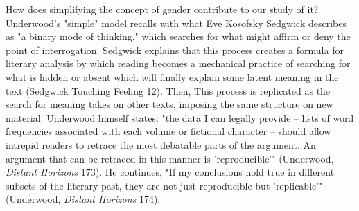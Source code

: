 \documentclass[11pt]{article}
\begin{document}
How does simplifying the concept of gender contribute to our study of
it? Underwood's "simple" model recalls with what Eve Kosofsky Sedgwick
describes as "a binary mode of thinking," which searches for what
might affirm or deny the point of interrogation. Sedgwick explains
that this process creates a formula for literary analysis by which
reading becomes a mechanical practice of searching for what is hidden
or absent which will finally explain some latent meaning in the text
(Sedgwick Touching Feeling 12). Then, This process is replicated as
the search for meaning takes on other texts, imposing the same
structure on new material. Underwood himself states: "the data I can
legally provide -- lists of word frequencies associated with each
volume or fictional character -- should allow intrepid readers to
retrace the most debatable parts of the argument. An argument that can
be retraced in this manner is 'reproducible'" (Underwood, \emph{Distant
Horizons} 173). He continues, "If my conclusions hold true in
different subsets of the literary past, they are not just reproducible
but 'replicable'" (Underwood, \emph{Distant Horizons} 174).
\end{document}
